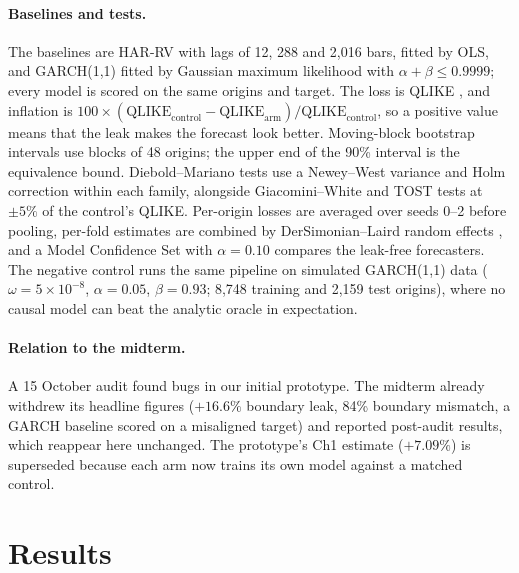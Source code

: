 \documentclass{article}
\begin{document}
\paragraph{Baselines and tests.}
The baselines are HAR-RV \citep{corsi2009har} with lags of 12, 288 and 2,016 bars, fitted by OLS,
and GARCH(1,1) \citep{bollerslev1986garch} fitted by Gaussian maximum likelihood with
$\alpha+\beta \le 0.9999$; every model is scored on the same origins and target. The loss is QLIKE
\citep{patton2011volatility}, and inflation is
$100 \times (\mathrm{QLIKE}_{\text{control}} - \mathrm{QLIKE}_{\text{arm}})/\mathrm{QLIKE}_{\text{control}}$,
so a positive value means that the leak makes the forecast look better. Moving-block bootstrap
intervals use blocks of 48 origins; the upper end of the 90\% interval is the equivalence bound.
Diebold--Mariano tests \citep{diebold1995comparing} use a Newey--West variance and Holm correction
\citep{holm1979simple} within each family, alongside Giacomini--White \citep{giacomini2006tests} and
TOST tests at $\pm5\%$ of the control's QLIKE. Per-origin losses are averaged over seeds 0--2
before pooling, per-fold estimates are combined by DerSimonian--Laird random effects
\citep{dersimonian1986meta}, and a Model Confidence Set \citep[MCS;][]{hansen2011mcs} with
$\alpha=0.10$ compares the leak-free forecasters. The negative control runs the same pipeline on
simulated GARCH(1,1) data ($\omega=5\times10^{-8}$, $\alpha=0.05$, $\beta=0.93$; 8,748 training and
2,159 test origins), where no causal model can beat the analytic oracle in expectation.

\paragraph{Relation to the midterm.}
A 15 October audit found bugs in our initial prototype. The midterm already withdrew its headline
figures ($+16.6\%$ boundary leak, 84\% boundary mismatch, a GARCH baseline scored on a misaligned
target) and reported post-audit results, which reappear here unchanged. The prototype's Ch1 estimate
($+7.09\%$) is superseded because each arm now trains its own model against a matched control.

\section{Results}
\end{document}
